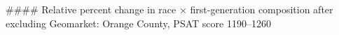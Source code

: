 #### Relative percent change in race × first-generation composition after excluding Geomarket: Orange County, PSAT score 1190–1260
